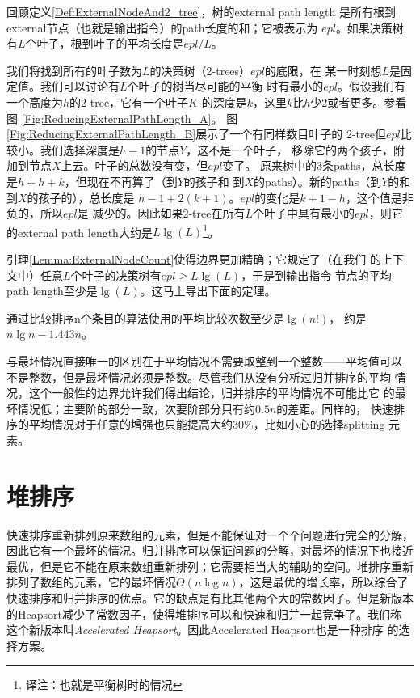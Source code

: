 回顾定义\ref{Def:ExternalNodeAnd2_tree}，树的external path length
是所有根到external节点（也就是输出指令）的path长度的和；它被表示为
$epl$。如果决策树有$L$个叶子，根到叶子的平均长度是$epl/L$。

我们将找到所有的叶子数为$L$的决策树（2-trees）$epl$的底限，在
某一时刻想$L$是固定值。我们可以讨论有$L$个叶子的树当尽可能的平衡
时有最小的$epl$。假设我们有一个高度为$h$的2-tree，它有一个叶子$K$
的深度是$k$，这里$k$比$h$少2或者更多。参看图
\ref{Fig:ReducingExternalPathLength_A}。
图\ref{Fig:ReducingExternalPathLength_B}展示了一个有同样数目叶子的
2-tree但$epl$比较小。我们选择深度是$h-1$的节点$Y$，这不是一个叶子，
移除它的两个孩子，附加到节点$X$上去。叶子的总数没有变，但$epl$变了。
原来树中的3条paths，总长度是$h+h+k$，但现在不再算了（到$Y$的孩子和
到$X$的paths）。新的paths（到$Y$的和到$X$的孩子的），总长度是
$h-1+2(k+1)$。$epl$的变化是$k+1-h$，这个值是非负的，所以$epl$是
减少的。因此如果2-tree在所有$L$个叶子中具有最小的$epl$，则它的external
path length大约是$L\lg(L)$\footnote{译注：也就是平衡树时的情况}。

引理\ref{Lemma:ExternalNodeCount}使得边界更加精确；它规定了（在我们
的上下文中）任意$L$个叶子的决策树有$epl \geq L\lg(L)$，于是到输出指令
节点的平均path length至少是$\lg(L)$。这马上导出下面的定理。

\begin{theorem}\label{Theorem::LowerBoundOfSort}
通过比较排序n个条目的算法使用的平均比较次数至少是$\lg(n!)$，
约是$n\lg n -1.443n$。
\end{theorem}

与最坏情况直接唯一的区别在于平均情况不需要取整到一个整数——平均值可以
不是整数，但是最坏情况必须是整数。尽管我们从没有分析过归并排序的平均
情况，这个一般性的边界允许我们得出结论，归并排序的平均情况不可能比它
的最坏情况低；主要阶的部分一致，次要阶部分只有约$0.5n$的差距。同样的，
快速排序的平均情况对于任意的增强也只能提高大约30\%，比如小心的选择splitting
元素。

\section{堆排序}\label{Sec:HeapSort}
快速排序重新排列原来数组的元素，但是不能保证对一个个问题进行完全的分解，
因此它有一个最坏的情况。归并排序可以保证问题的分解，对最坏的情况下也接近
最优，但是它不能在原来数组重新排列；它需要相当大的辅助的空间。堆排序重新
排列了数组的元素，它的最坏情况$\Theta(n\log n)$，这是最优的增长率，所以综合了
快速排序和归并排序的优点。它的缺点是有比其他两个大的常数因子。但是新版本
的Heapsort减少了常数因子，使得堆排序可以和快速和归并一起竞争了。我们称
这个新版本叫\emph{Accelerated Heapsort}。因此Accelerated Heapsort也是一种排序
的选择方案。

